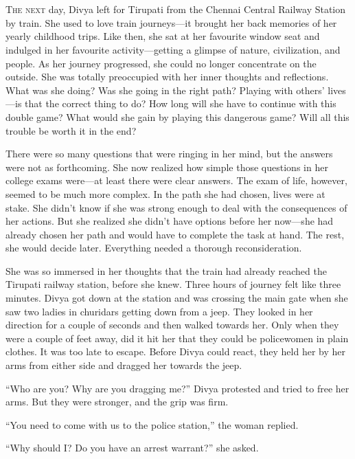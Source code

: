 \chapter{}

\lettrine{T}{he next} day, Divya left for Tirupati from the Chennai Central
Railway Station by train. She used to love train journeys—it brought her back
memories of her yearly childhood trips. Like then, she sat at her favourite
window seat and indulged in her favourite activity—getting a glimpse of nature,
civilization, and people. As her journey progressed, she could no longer concentrate
on the outside. She was totally preoccupied with her inner thoughts and reflections.
What was she doing?  Was she going in the right path? Playing with others'
lives—is that the correct thing to do? How long will she have to continue with
this double game? What would she gain by playing this dangerous game? Will all
this trouble be worth it in the end?

There were so many questions that were ringing in her mind, but the answers were
not as forthcoming. She now realized how simple those questions in her college
exams were—at least there were clear answers. The exam of life, however, seemed
to be much more complex. In the path she had chosen, lives were at stake. She
didn't know if she was strong enough to deal with the consequences of her
actions. But she realized she didn't have options before her now—she had already
chosen her path and would have to complete the task at hand. The rest, she would
decide later. Everything needed a thorough reconsideration.

She was so immersed in her thoughts that the train had already reached the
Tirupati railway station, before she knew. Three hours of journey felt like
three minutes. Divya got down at the station and was crossing the main gate when
she saw two ladies in churidars getting down from a jeep. They looked in her
direction for a couple of seconds and then walked towards her. Only when they
were a couple of feet away, did it hit her that they could be policewomen in
plain clothes. It was too late to escape.  Before Divya could react, they held
her by her arms from either side and dragged her towards the jeep.

“Who are you? Why are you dragging me?” Divya protested and tried to free her
arms. But they were stronger, and the grip was firm.

“You need to come with us to the police station,” the woman replied.

“Why should I? Do you have an arrest warrant?” she asked.

